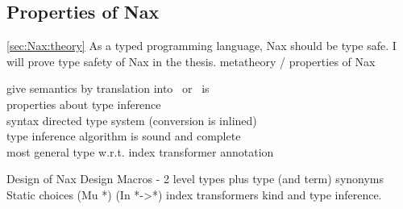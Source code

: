 \subsection{Properties of Nax}\ref{sec:Nax:theory}
As a typed programming language, Nax should be type safe.
I will prove type safety of Nax in the thesis.
metatheory / properties of Nax

give semantics by translation into \Fi\ or \Fixw\ is \\

properties about type inference \\
syntax directed type system (conversion is inlined) \\
type inference algorithm is sound and complete \\
most general type w.r.t. index transformer annotation

Design of Nax
    Design Macros - 2 level types plus type (and term) synonyms
    Static choices (Mu *)  (In *->*)   index transformers
    kind and type inference.

